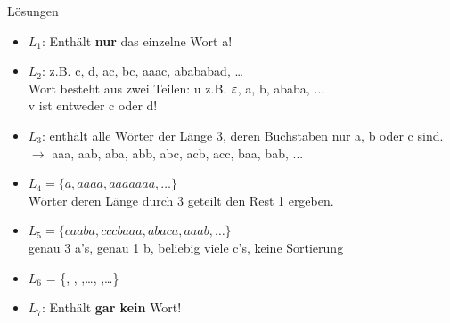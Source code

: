 {
\begin{frame}{Lösungen}
  \begin{itemize}[<+- | alert@+>]
        \item 
            $L_1$: Enthält \textbf{nur} das einzelne Wort a!
        \item
            $L_2$: z.B. c, d, ac, bc, aaac, abababad, \dots\\
            Wort besteht aus zwei Teilen: u z.B. $\varepsilon$, a, b, ababa, ...\\ v ist entweder c oder d!
        \item
            $L_3$: enthält alle Wörter der Länge 3, deren Buchstaben nur a, b oder c sind.\\
            $\rightarrow$ aaa, aab, aba, abb, abc, acb, acc, baa, bab, ...
        \item
            $L_4 = \{a, aaaa, aaaaaaa, \dots\}$\\
            Wörter deren Länge durch 3 geteilt den Rest 1 ergeben.
        \item
            $L_5 = \{caaba, cccbaaa, abaca, aaab, \dots\}$\\
            genau 3 a's, genau 1 b, beliebig viele c's, keine Sortierung
        \item
            $L_6$ = \{\Stopsign, \Rewind \Stopsign, \MoveUp \Stopsign,\dots\;, \MoveDown \Rewind \MoveDown \Stopsign,\dots\}
            \item $L_7$: Enthält \textbf{gar kein} Wort!
    \end{itemize}
\end{frame}
}

